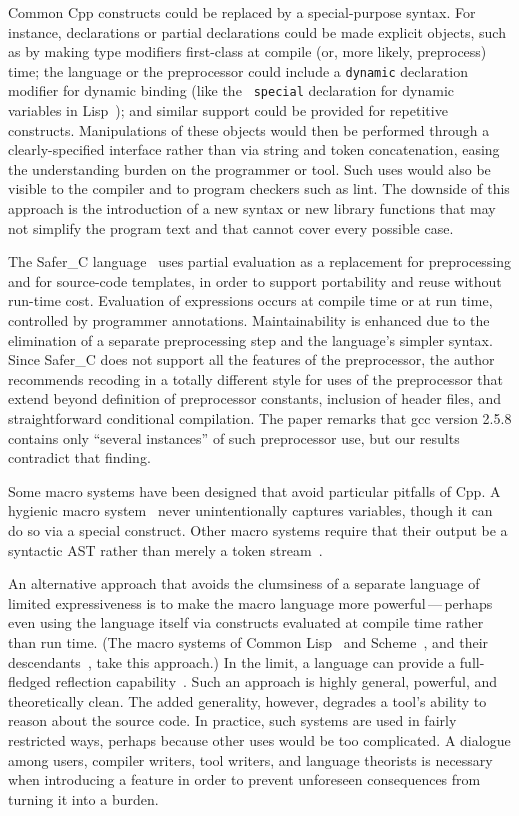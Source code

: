 \documentclass[10pt]{article}
\newcommand{\pkg}[1]{\textsf{#1}}
\begin{document}
Common Cpp constructs could be replaced by a special-purpose syntax.  For
instance, declarations or partial declarations could be made explicit
objects, such as by making type modifiers first-class at compile (or, more
likely, preprocess) time; the language or the preprocessor could include a
{\tt dynamic} declaration modifier for dynamic binding (like the {\tt
special} declaration for dynamic variables in
Lisp~\cite{commonlisp:languagespec}); and
similar support could be provided for repetitive constructs.  Manipulations
of these objects would then be performed through a clearly-specified
interface rather than via string and token concatenation, easing the
understanding burden on the programmer or tool.  Such uses would also be
visible to the compiler and to program checkers such as lint.  The downside
of this approach is the introduction of a new syntax or new library
functions that may not simplify the program text and that cannot cover
every possible case.

The Safer\_C language~\cite{ICCC::Salomon1996} uses partial evaluation as a
replacement for preprocessing and for source-code templates, in order to
support portability and reuse without run-time cost.  Evaluation of
expressions occurs at compile time or at run time, controlled by programmer
annotations.  Maintainability is enhanced due to the elimination of a
separate preprocessing step and the language's simpler syntax.  Since
Safer\_C does not support all the features of the preprocessor, the author
recommends recoding in a totally different style for uses of the
preprocessor that extend beyond definition of preprocessor constants,
inclusion of header files, and straightforward conditional compilation.
The paper remarks that \pkg{gcc} version 2.5.8 contains only ``several
instances'' of such preprocessor use, but our results contradict that
finding.

Some macro systems have been designed that avoid particular pitfalls of Cpp.
A hygienic macro system~\cite{lfp86*151} never unintentionally captures
variables, though it can do so via a special construct.
Other macro systems require that their output be a syntactic AST rather
than merely a token stream~\cite{WeiseC93}.

An alternative approach that avoids the clumsiness of a separate language
of limited expressiveness is to make the macro language more
powerful\,---\,perhaps even using the language itself via constructs
evaluated at compile time rather than run time.  (The macro systems of
Common Lisp~\cite{commonlisp:languagespec} and
Scheme~\cite{KelseyCR98}, and their descendants~\cite{WeiseC93}, take
this approach.)  In the limit, a language can provide a full-fledged
reflection capability~\cite{kicz91}.  Such an approach is highly general,
powerful, and theoretically clean.  The added generality, however, degrades
a tool's ability to reason about the source code.  In practice, such
systems are used in fairly restricted ways, perhaps because other uses
would be too complicated.  A dialogue among users, compiler writers, tool
writers, and language theorists is necessary when introducing a feature in
order to prevent unforeseen consequences from turning it into a burden.
\end{document}
